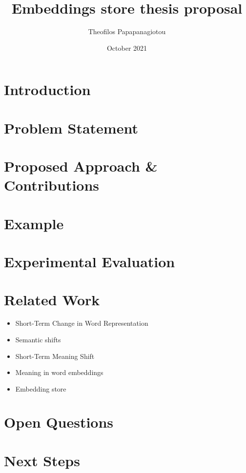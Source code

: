\documentclass{article}
\title{Embeddings store thesis proposal}
\author{Theofilos Papapanagiotou}
\date{October 2021}
\begin{document}
\maketitle
\section{Introduction}
\section{Problem Statement}
\section{Proposed Approach \& Contributions}
\section{Example}
\section{Experimental Evaluation}
\section{Related Work}
\begin{itemize}
    \item Short-Term Change in Word Representation~\cite{stewartMeasuringPredictingVisualizing}
    \item Semantic shifts~\cite{azarbonyadWordsAreMalleable2017}
    \item Short-Term Meaning Shift~\cite{deltrediciShortTermMeaningShift2018}
    \item Meaning in word embeddings~\cite{mikolovDistributedRepresentationsWords2013}
    \item Embedding store~\cite{orrManagingMLPipelines2021a}
\end{itemize}
\section{Open Questions}
\section{Next Steps}

\printbibliography
\end{document}
